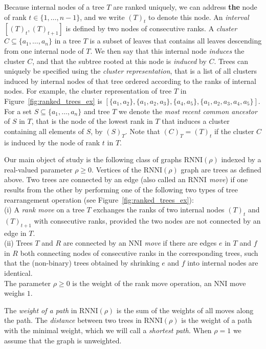 \documentclass[11pt]{amsart}
\newcommand{\rnni}{\mathrm{RNNI}}
\newcommand{\nni}{\mathrm{NNI}}
\begin{document}
Because internal nodes of a tree $T$ are ranked uniquely, we can address \textbf{the} node of rank ${t \in \{1, \ldots, n - 1\}}$, and we write $(T)_t$ to denote this node.
An \emph{interval} $[(T)_t,(T)_{t+1}]$ is defined by two nodes of consecutive ranks.
A \emph{cluster} $C \subseteq \{a_1, \ldots, a_n\}$ in a tree $T$ is a subset of leaves that contains all leaves descending from one internal node of $T$.
We then say that this internal node \emph{induces} the cluster $C$, and that the subtree rooted at this node is \emph{induced} by $C$.
Trees can uniquely be specified using the \emph{cluster representation}, that is a list of all clusters induced by internal nodes of that tree ordered according to the ranks of internal nodes.
For example, the cluster representation of tree $T$ in Figure~\ref{fig:ranked_trees_ex} is $[\{a_1, a_2\}, \{a_1, a_2, a_3\}, \{a_4, a_5\}, \{a_1,a_2,a_3,a_4,a_5\}]$.
For a set $S \subseteq \{a_1, \ldots, a_n\}$ and tree $T$ we denote the \emph{most recent common ancestor} of $S$ in $T$, that is the node of the lowest rank in $T$ that induces a cluster containing all elements of $S$, by $(S)_T$.
Note that $(C)_T = (T)_t$ if the cluster $C$ is induced by the node of rank $t$ in $T$.

Our main object of study is the following class of graphs $\rnni(\rho)$ indexed by a real-valued parameter $\rho \geq 0$.
Vertices of the $\rnni(\rho)$ graph are trees as defined above.
Two trees are connected by an edge (also called an \emph{$\rnni$ move}) if one results from the other by performing one of the following two types of tree rearrangement operation (see Figure~\ref{fig:ranked_trees_ex}):\\
(i) A \emph{rank move} on a tree $T$ exchanges the ranks of two internal nodes $(T)_t$ and $(T)_{t+1}$ with consecutive ranks, provided the two nodes are not connected by an edge in $T$.\\
(ii) Trees $T$ and $R$ are connected by an \emph{$\nni$ move} if there are edges $e$ in $T$ and $f$ in $R$ both connecting nodes of consecutive ranks in the corresponding trees, such that the (non-binary) trees obtained by shrinking $e$ and $f$ into internal nodes are identical.\\
The parameter $\rho \geq 0$ is the weight of the rank move operation, an $\nni$ move weighs $1$.

The \emph{weight of a path} in $\rnni(\rho)$ is the sum of the weights of all moves along the path.
The \emph{distance} between two trees in $\rnni(\rho)$ is the weight of a path with the minimal weight, which we will call a \emph{shortest path}.
When $\rho = 1$ we assume that the graph is unweighted.
\end{document}
